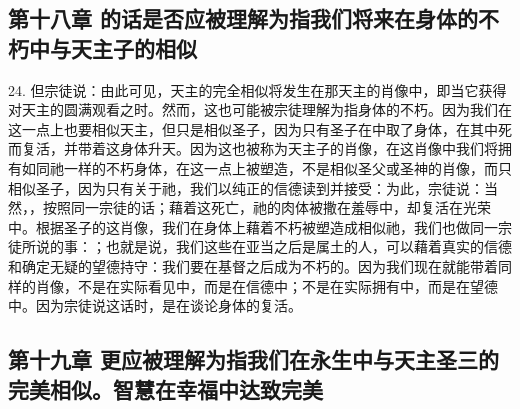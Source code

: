 
\subsection{第十八章 的话是否应被理解为指我们将来在身体的不朽中与天主子的相似}

24. 但宗徒说：由此可见，天主的完全相似将发生在那天主的肖像中，即当它获得对天主的圆满观看之时。然而，这也可能被宗徒理解为指身体的不朽。因为我们在这一点上也要相似天主，但只是相似圣子，因为只有圣子在中取了身体，在其中死而复活，并带着这身体升天。因为这也被称为天主子的肖像，在这肖像中我们将拥有如同祂一样的不朽身体，在这一点上被塑造，不是相似圣父或圣神的肖像，而只相似圣子，因为只有关于祂，我们以纯正的信德读到并接受：为此，宗徒说：当然，，按照同一宗徒的话；藉着这死亡，祂的肉体被撒在羞辱中，却复活在光荣中。根据圣子的这肖像，我们在身体上藉着不朽被塑造成相似祂，我们也做同一宗徒所说的事：；也就是说，我们这些在亚当之后是属土的人，可以藉着真实的信德和确定无疑的望德持守：我们要在基督之后成为不朽的。因为我们现在就能带着同样的肖像，不是在实际看见中，而是在信德中；不是在实际拥有中，而是在望德中。因为宗徒说这话时，是在谈论身体的复活。\par


\subsection{第十九章 更应被理解为指我们在永生中与天主圣三的完美相似。智慧在幸福中达致完美}

